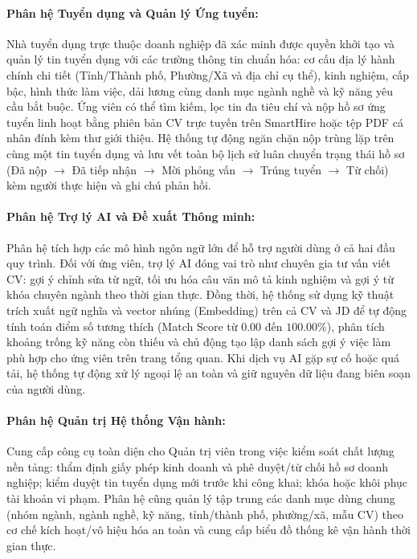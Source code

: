 \paragraph{Phân hệ Tuyển dụng và Quản lý Ứng tuyển:}
Nhà tuyển dụng trực thuộc doanh nghiệp đã xác minh được quyền khởi tạo và quản lý tin tuyển dụng với các trường thông tin chuẩn hóa: cơ cấu địa lý hành chính chi tiết (Tỉnh/Thành phố, Phường/Xã và địa chỉ cụ thể), kinh nghiệm, cấp bậc, hình thức làm việc, dải lương cùng danh mục ngành nghề và kỹ năng yêu cầu bắt buộc. 
Ứng viên có thể tìm kiếm, lọc tin đa tiêu chí và nộp hồ sơ ứng tuyển linh hoạt bằng phiên bản CV trực tuyến trên SmartHire hoặc tệp PDF cá nhân đính kèm thư giới thiệu. Hệ thống tự động ngăn chặn nộp trùng lặp trên cùng một tin tuyển dụng và lưu vết toàn bộ lịch sử luân chuyển trạng thái hồ sơ (Đã nộp $\rightarrow$ Đã tiếp nhận $\rightarrow$ Mời phỏng vấn $\rightarrow$ Trúng tuyển $\rightarrow$ Từ chối) kèm người thực hiện và ghi chú phản hồi.

\paragraph{Phân hệ Trợ lý AI và Đề xuất Thông minh:}
Phân hệ tích hợp các mô hình ngôn ngữ lớn để hỗ trợ người dùng ở cả hai đầu quy trình. Đối với ứng viên, trợ lý AI đóng vai trò như chuyên gia tư vấn viết CV: gợi ý chỉnh sửa từ ngữ, tối ưu hóa câu văn mô tả kinh nghiệm và gợi ý từ khóa chuyên ngành theo thời gian thực. 
Đồng thời, hệ thống sử dụng kỹ thuật trích xuất ngữ nghĩa và vector nhúng (Embedding) trên cả CV và JD để tự động tính toán điểm số tương thích (Match Score từ $0.00$ đến $100.00\%$), phân tích khoảng trống kỹ năng còn thiếu và chủ động tạo lập danh sách gợi ý việc làm phù hợp cho ứng viên trên trang tổng quan. Khi dịch vụ AI gặp sự cố hoặc quá tải, hệ thống tự động xử lý ngoại lệ an toàn và giữ nguyên dữ liệu đang biên soạn của người dùng.

\paragraph{Phân hệ Quản trị Hệ thống Vận hành:}
Cung cấp công cụ toàn diện cho Quản trị viên trong việc kiểm soát chất lượng nền tảng: thẩm định giấy phép kinh doanh và phê duyệt/từ chối hồ sơ doanh nghiệp; kiểm duyệt tin tuyển dụng mới trước khi công khai; khóa hoặc khôi phục tài khoản vi phạm. Phân hệ cũng quản lý tập trung các danh mục dùng chung (nhóm ngành, ngành nghề, kỹ năng, tỉnh/thành phố, phường/xã, mẫu CV) theo cơ chế kích hoạt/vô hiệu hóa an toàn và cung cấp biểu đồ thống kê vận hành thời gian thực.

